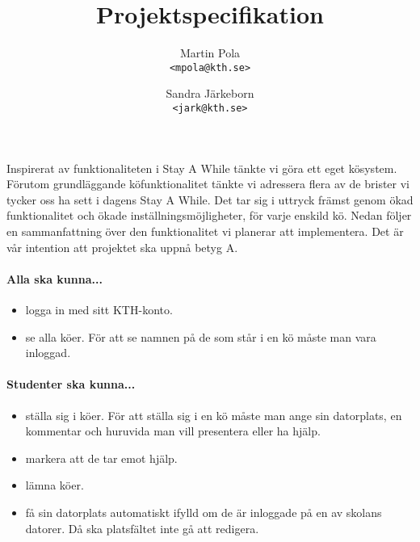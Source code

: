 \documentclass[a4paper]{article}
\title{Projektspecifikation}
\author
{
	Martin Pola \\ \texttt{<mpola@kth.se>} \and
	Sandra Järkeborn \\ \texttt{<jark@kth.se>}
}
\begin{document}
	\maketitle
	
	Inspirerat av funktionaliteten i Stay A While tänkte vi göra ett eget kösystem. Förutom grundläggande köfunktionalitet tänkte vi adressera flera av de brister vi tycker oss ha sett i dagens Stay A While. Det tar sig i uttryck främst genom ökad funktionalitet och ökade inställningsmöjligheter, för varje enskild kö. Nedan följer en sammanfattning över den funktionalitet vi planerar att implementera. Det är vår intention att projektet ska uppnå betyg A.
	
	\paragraph{Alla ska kunna...}
	\begin{itemize}
		\item logga in med sitt KTH-konto.
		\item se alla köer. För att se namnen på de som står i en kö måste man vara inloggad.
	\end{itemize}
	
	\paragraph{Studenter ska kunna...}
	\begin{itemize}
		\item ställa sig i köer. För att ställa sig i en kö måste man ange sin datorplats, en kommentar och huruvida man vill presentera eller ha hjälp.
		\item markera att de tar emot hjälp.
		\item lämna köer.
		\item få sin datorplats automatiskt ifylld om de är inloggade på en av skolans datorer. Då ska platsfältet inte gå att redigera.
	\end{itemize}
\end{document}
